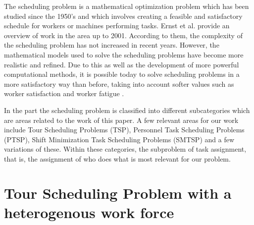 
The scheduling problem is a mathematical optimization problem which has been studied since the 1950's and which involves creating a feasible and satisfactory schedule for workers or machines performing tasks. Ernst et al. provide an overview of work in the area up to 2001. According to them, the complexity of the scheduling problem has not increased in recent years. However, the mathematical models used to solve the scheduling problems have become more realistic and refined. Due to this as well as the development of more powerful computational methods, it is possible today to solve scheduling problems in a more satisfactory way than before, taking into account softer values such as worker satisfaction and worker fatigue \cite{Ernst_2004}.

In the part \cite{Ernst_2004} the scheduling problem is classified into different subcategories which are areas related to the work of this paper. A few relevant areas for our work include Tour Scheduling Problems (TSP), Personnel Task Scheduling Problems (PTSP), Shift Minimization Task Scheduling Problems (SMTSP) and a few variations of these. Within these categories, the subproblem of task assignment, that is, the assignment of who does what is most relevant for our problem.



%
%	
%
%


\section{Tour Scheduling Problem with a heterogenous work force}\label{TSP}

